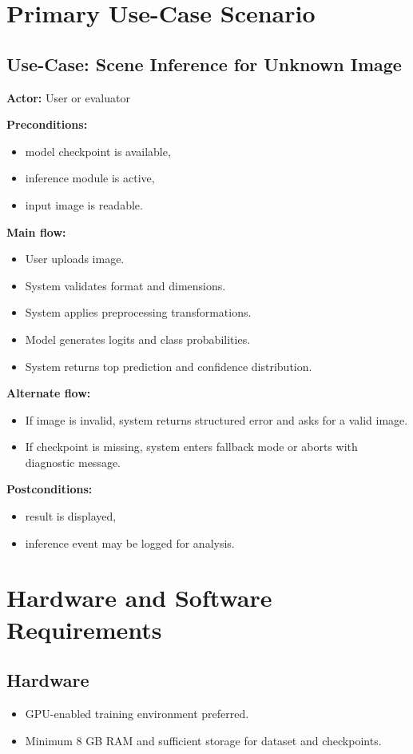 \section{Primary Use-Case Scenario}
\subsection{Use-Case: Scene Inference for Unknown Image}
\textbf{Actor:} User or evaluator

\textbf{Preconditions:}
\begin{itemize}
\item model checkpoint is available,
\item inference module is active,
\item input image is readable.
\end{itemize}

\textbf{Main flow:}
\begin{itemize}
\item User uploads image.
\item System validates format and dimensions.
\item System applies preprocessing transformations.
\item Model generates logits and class probabilities.
\item System returns top prediction and confidence distribution.
\end{itemize}

\textbf{Alternate flow:}
\begin{itemize}
\item If image is invalid, system returns structured error and asks for a valid image.
\item If checkpoint is missing, system enters fallback mode or aborts with diagnostic message.
\end{itemize}

\textbf{Postconditions:}
\begin{itemize}
\item result is displayed,
\item inference event may be logged for analysis.
\end{itemize}

\section{Hardware and Software Requirements}
\subsection{Hardware}
\begin{itemize}
\item GPU-enabled training environment preferred.
\item Minimum 8 GB RAM and sufficient storage for dataset and checkpoints.
\end{itemize}

